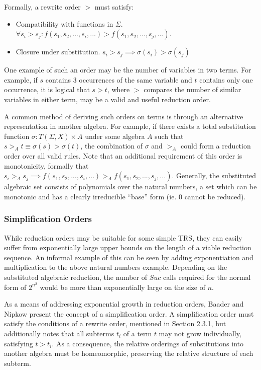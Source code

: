 \documentclass{article}
\begin{document}
Formally, a rewrite order $>$ must satisfy:
\begin{itemize}
    \item Compatibility with functions in $\Sigma$. $\forall s_i > s_j: f(s_1, s_2, ..., s_i, ...) > f(s_1, s_2, ..., s_j, ...)$.
    \item Closure under substitution. $ s_i > s_j \implies \sigma(s_i) > \sigma(s_j)$
\end{itemize}
One example of such an order may be the number of variables in two terms.
For example, if $s$ contains 3 occurrences of the same variable and $t$ contains only one occurrence,
it is logical that $s > t$, where $>$ compares the number of similar variables in either term, may be a valid and useful reduction order.

A common method of deriving such orders on terms is through an alternative representation in another algebra.
For example, if there exists a total substitution function $\sigma: T(\Sigma,X) \times A$ under some algebra $A$ such that $s >_A t \equiv \sigma(s) > \sigma(t)$,
the combination of $\sigma$ and $>_A$ could form a reduction order over all valid rules. Note that an additional requirement of this order is monotonicity, formally
that $s_i >_A s_j \implies f(s_1, s_2, ..., s_i, ...) >_A f(s_1, s_2, ..., s_j, ...)$. Generally, the substituted algebraic set consists of polynomials over the natural numbers,
a set which can be monotonic and has a clearly irreducible ``base'' form (ie. 0 cannot be reduced).

\subsubsection{Simplification Orders}
While reduction orders may be suitable for some simple TRS, they can easily suffer from exponentially large upper bounds on the length of a viable reduction sequence.
An informal example of this can be seen by adding exponentiation and multiplication to the above natural numbers example.
Depending on the substituted algebraic reduction, the number of $Suc$ calls required for the normal form of $2^{n^2}$ would be
more than exponentially large on the size of $n$.

As a means of addressing exponential growth in reduction orders, Baader and Nipkow \cite{baader1998term} present the concept of a simplification order.
A simplification order must satisfy the conditions of a rewrite order, mentioned in Section 2.3.1, but additionally notes that all subterms $t_i$ of a term $t$
may not grow individually, satisfying $t > t_i$. As a consequence, the relative orderings of substitutions into another algebra must be homeomorphic, preserving the relative
structure of each subterm.
\end{document}
